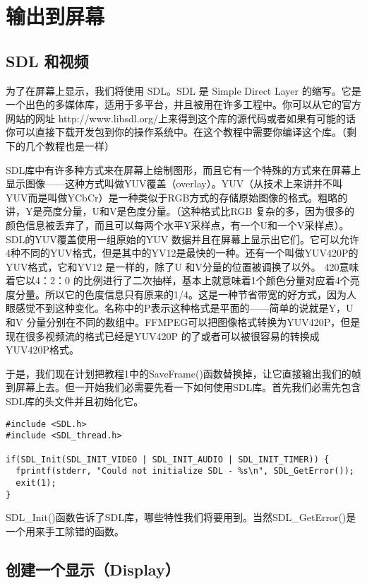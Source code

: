 ﻿\chapter{输出到屏幕}
\label{ch2}
\section{SDL 和视频}
为了在屏幕上显示，我们将使用 SDL。SDL 是 Simple Direct Layer 的缩写。它是一个出色的多媒体库，适用于多平台，并且被用在许多工程中。你可以从它的官方网站的网址 http://www.libsdl.org/上来得到这个库的源代码或者如果有可能的话你可以直接下载开发包到你的操作系统中。在这个教程中需要你编译这个库。（剩下的几个教程也是一样）

SDL库中有许多种方式来在屏幕上绘制图形，而且它有一个特殊的方式来在屏幕上显示图像——这种方式叫做YUV覆盖（overlay）。YUV（从技术上来讲并不叫YUV而是叫做YCbCr）是一种类似于RGB方式的存储原始图像的格式。粗略的讲，Y是亮度分量，U和V是色度分量。（这种格式比RGB 复杂的多，因为很多的颜色信息被丢弃了，而且可以每两个水平Y采样点，有一个U和一个V采样点）。SDL的YUV覆盖使用一组原始的YUV 数据并且在屏幕上显示出它们。它可以允许4种不同的YUV格式，但是其中的YV12是最快的一种。还有一个叫做YUV420P的YUV格式，它和YV12 是一样的，除了U 和V分量的位置被调换了以外。 420意味着它以4：2：0 的比例进行了二次抽样，基本上就意味着1个颜色分量对应着4个亮度分量。所以它的色度信息只有原来的1/4。这是一种节省带宽的好方式，因为人眼感觉不到这种变化。名称中的P表示这种格式是平面的——简单的说就是Y，U和V 分量分别在不同的数组中。FFMPEG可以把图像格式转换为YUV420P，但是现在很多视频流的格式已经是YUV420P 的了或者可以被很容易的转换成YUV420P格式。

于是，我们现在计划把教程1中的SaveFrame()函数替换掉，让它直接输出我们的帧到屏幕上去。但一开始我们必需要先看一下如何使用SDL库。首先我们必需先包含SDL库的头文件并且初始化它。

\begin{lstlisting}
#include <SDL.h>
#include <SDL_thread.h>

if(SDL_Init(SDL_INIT_VIDEO | SDL_INIT_AUDIO | SDL_INIT_TIMER)) {
  fprintf(stderr, "Could not initialize SDL - %s\n", SDL_GetError());
  exit(1);
}
\end{lstlisting}

SDL_Init()函数告诉了SDL库，哪些特性我们将要用到。当然SDL_GetError()是一个用来手工除错的函数。

\section{创建一个显示（Display）}

